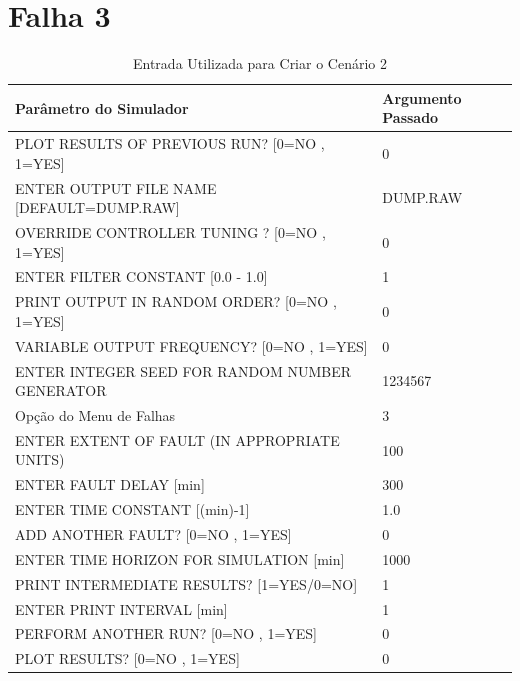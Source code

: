 \documentclass[journal]{IEEEtran}
\begin{document}
\clearpage
\section*{Falha 3}

\begin{table}[H]
	\centering
	\normalsize
	\begin{tabular}{|l|l|}
		\hline
		Parâmetro do Simulador											 		& Argumento Passado \\
		\hline\hline
		PLOT RESULTS OF PREVIOUS RUN? [0=NO , 1=YES] 		& 0 				\\ \hline
		ENTER OUTPUT FILE NAME [DEFAULT=DUMP.RAW] 			& DUMP.RAW	\\ \hline
		OVERRIDE CONTROLLER TUNING ? [0=NO , 1=YES] 		& 0 				\\ \hline
		ENTER FILTER CONSTANT [0.0 - 1.0]								& 1 				\\ \hline
		PRINT OUTPUT IN RANDOM ORDER? [0=NO , 1=YES]		& 0 				\\ \hline
		VARIABLE OUTPUT FREQUENCY? [0=NO , 1=YES]				& 0 				\\ \hline
		ENTER INTEGER SEED FOR RANDOM NUMBER GENERATOR	& 1234567		\\ \hline
		Opção do Menu de Falhas		 											& 3 				\\ \hline
		ENTER EXTENT OF FAULT (IN APPROPRIATE UNITS) 		& 100				\\ \hline
		ENTER FAULT DELAY [min]													& 300				\\ \hline
		ENTER TIME CONSTANT [(min)-1]										& 1.0				\\ \hline
		ADD ANOTHER FAULT? [0=NO , 1=YES]								& 0 				\\ \hline
		ENTER TIME HORIZON FOR SIMULATION [min]  				& 1000			\\ \hline
		PRINT INTERMEDIATE RESULTS? [1=YES/0=NO] 				& 1 				\\ \hline
		ENTER PRINT INTERVAL [min]						  				& 1 				\\ \hline
		PERFORM ANOTHER RUN? [0=NO , 1=YES] 	  				& 0 				\\ \hline
		PLOT RESULTS? [0=NO , 1=YES] 					  				& 0 				\\ \hline
	\end{tabular}
	\caption{Entrada Utilizada para Criar o Cenário 2}
\end{table}
\end{document}

